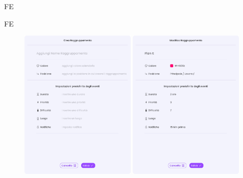 \begin{listaPersonale}{FE}
\begin{listaPersonale2}{FE}
        \begin{center} 
            \begin{figure}[H]
            \centering\includegraphics[width=0.49\textwidth,height=0.35\textheight]{img/FrontEnd/Eventi/Raggruppamento/CreaRaggruppamento.png}
            \centering\includegraphics[width=0.49\textwidth,height=0.35\textheight]{img/FrontEnd/Eventi/Raggruppamento/ModificaRaggruppamento.png}
            \end{figure}
        \end{center}
        \pagebreak


\end{listaPersonale2}
\end{listaPersonale}
